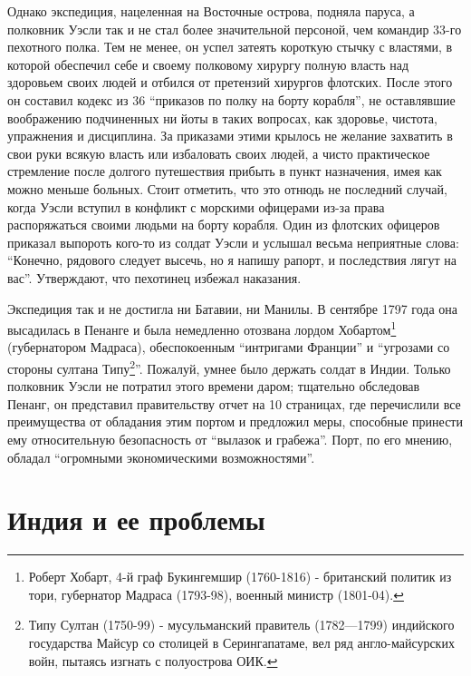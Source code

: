 \documentclass[
  oneside,
  12pt,
  titlepage]{book}
\begin{document}
Однако экспедиция, нацеленная на Восточные острова, подняла паруса, а полковник Уэсли так и не стал более значительной персоной, чем командир 33-го пехотного полка. Тем не менее, он успел затеять короткую стычку с властями, в которой обеспечил себе и своему полковому хирургу полную власть над здоровьем своих людей и отбился от претензий хирургов флотских. После этого он составил кодекс из 36 ``приказов по полку на борту корабля'', не оставлявшие воображению подчиненных ни йоты в таких вопросах, как здоровье, чистота, упражнения и дисциплина. За приказами этими крылось не желание захватить в свои руки всякую власть или избаловать своих людей, а чисто практическое стремление после долгого путешествия прибыть в пункт назначения, имея как можно меньше больных. Стоит отметить, что это отнюдь не последний случай, когда Уэсли вступил в конфликт с морскими офицерами из-за права распоряжаться своими людьми на борту корабля. Один из флотских офицеров приказал выпороть кого-то из солдат Уэсли и услышал весьма неприятные слова: ``Конечно, рядового следует высечь, но я напишу рапорт, и последствия лягут на вас''. Утверждают, что пехотинец избежал наказания.

Экспедиция так и не достигла ни Батавии, ни Манилы. В сентябре 1797 года она высадилась в Пенанге и была немедленно отозвана лордом Хобартом\footnote{Роберт Хобарт, 4-й граф Букингемшир (1760-1816) - британский политик из тори, губернатор Мадраса (1793-98), военный министр (1801-04).} (губернатором Мадраса), обеспокоенным ``интригами Франции'' и ``угрозами со стороны султана Типу\footnote{Типу Султан (1750-99) - мусульманский правитель (1782---1799) индийского государства Майсур со столицей в Серингапатаме, вел ряд англо-майсурских войн, пытаясь изгнать с полуострова ОИК.}''. Пожалуй, умнее было держать солдат в Индии. Только полковник Уэсли не потратил этого времени даром; тщательно обследовав Пенанг, он представил правительству отчет на 10 страницах, где перечислили все преимущества от обладания этим портом и предложил меры, способные принести ему относительную безопасность от ``вылазок и грабежа''. Порт, по его мнению, обладал ``огромными экономическими возможностями''.

\hypertarget{ux438ux43dux434ux438ux44f-ux438-ux435ux435-ux43fux440ux43eux431ux43bux435ux43cux44b}{%
\chapter{Индия и ее проблемы}\label{ux438ux43dux434ux438ux44f-ux438-ux435ux435-ux43fux440ux43eux431ux43bux435ux43cux44b}}
\end{document}
